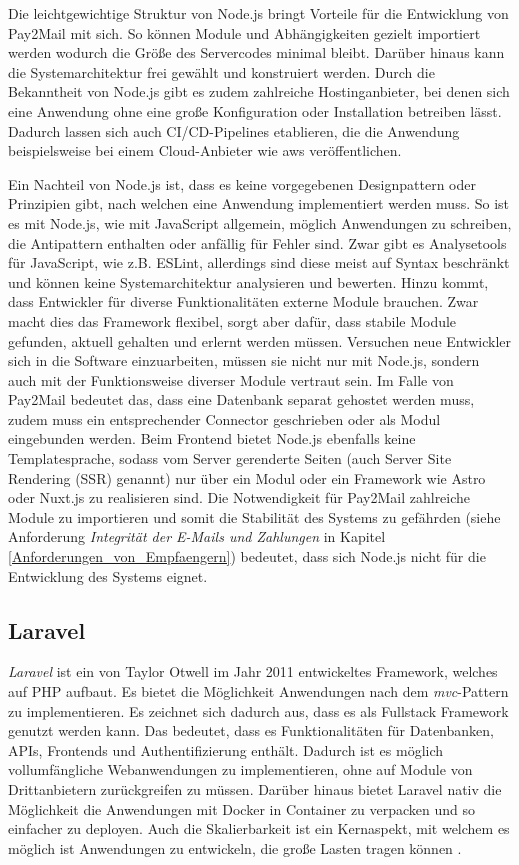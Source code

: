 Die leichtgewichtige Struktur von Node.js bringt Vorteile für die Entwicklung von Pay2Mail mit sich. So können Module und Abhängigkeiten gezielt importiert werden wodurch die Größe des Servercodes minimal bleibt. Darüber hinaus kann die Systemarchitektur frei gewählt und konstruiert werden. Durch die Bekanntheit von Node.js gibt es zudem zahlreiche Hostinganbieter, bei denen sich eine Anwendung ohne eine große Konfiguration oder Installation betreiben lässt. Dadurch lassen sich auch CI/CD-Pipelines etablieren, die die Anwendung beispielsweise bei einem Cloud-Anbieter wie \acrfull{aws} veröffentlichen.

Ein Nachteil von Node.js ist, dass es keine vorgegebenen Designpattern oder Prinzipien gibt, nach welchen eine Anwendung implementiert werden muss. So ist es mit Node.js, wie mit JavaScript allgemein, möglich Anwendungen zu schreiben, die Antipattern enthalten oder anfällig für Fehler sind. Zwar gibt es Analysetools für JavaScript, wie z.B. ESLint, allerdings sind diese meist auf Syntax beschränkt und können keine Systemarchitektur analysieren und bewerten. Hinzu kommt, dass Entwickler für diverse Funktionalitäten externe Module brauchen. Zwar macht dies das Framework flexibel, sorgt aber dafür, dass stabile Module gefunden, aktuell gehalten und erlernt werden müssen. Versuchen neue Entwickler sich in die Software einzuarbeiten, müssen sie nicht nur mit Node.js, sondern auch mit der Funktionsweise diverser Module vertraut sein. Im Falle von Pay2Mail bedeutet das, dass eine Datenbank separat gehostet werden muss, zudem muss ein entsprechender Connector geschrieben oder als Modul eingebunden werden. Beim Frontend bietet Node.js ebenfalls keine Templatesprache, sodass vom Server gerenderte Seiten (auch Server Site Rendering (SSR) genannt) nur über ein Modul oder ein Framework wie Astro oder Nuxt.js zu realisieren sind. Die Notwendigkeit für Pay2Mail zahlreiche Module zu importieren und somit die Stabilität des Systems zu gefährden (siehe Anforderung \textit{Integrität der E-Mails und Zahlungen} in Kapitel \ref{Anforderungen_von_Empfaengern}) bedeutet, dass sich Node.js nicht für die Entwicklung des Systems eignet.

\subsection{Laravel}
\label{Laravel}

\textit{Laravel} ist ein von Taylor Otwell im Jahr 2011 entwickeltes Framework, welches auf PHP aufbaut. Es bietet die Möglichkeit Anwendungen nach dem \textit{\acrfull{mvc}}-Pattern zu implementieren. Es zeichnet sich dadurch aus, dass es als Fullstack Framework genutzt werden kann. Das bedeutet, dass es Funktionalitäten für Datenbanken, APIs, Frontends und Authentifizierung enthält. Dadurch ist es möglich vollumfängliche Webanwendungen zu implementieren, ohne auf Module von Drittanbietern zurückgreifen zu müssen. Darüber hinaus bietet Laravel nativ die Möglichkeit die Anwendungen mit Docker in Container zu verpacken und so einfacher zu deployen. Auch die Skalierbarkeit ist ein Kernaspekt, mit welchem es möglich ist Anwendungen zu entwickeln, die große Lasten tragen können \citep{Otwell2022}.

